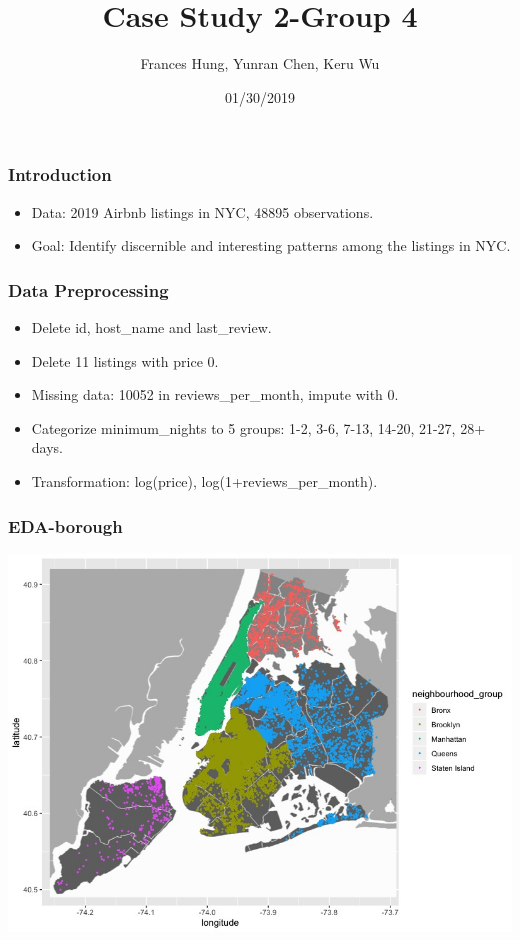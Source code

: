 \documentclass{beamer}
\title{Case Study 2-Group 4}
\author{Frances Hung, Yunran Chen, Keru Wu}
\institute{Department of Statistical Science, Duke University}
\date{01/30/2019}
\begin{document}
\frame{\titlepage}





\begin{frame}
\frametitle{Introduction}

\begin{itemize}
\item Data:  2019 Airbnb listings in NYC, 48895 observations.
  
\item Goal: Identify discernible and interesting patterns among the listings in NYC.

\end{itemize}

\end{frame}







\begin{frame}
\frametitle{Data Preprocessing}
\begin{itemize}
\item Delete id, host\_name and last\_review.
\item Delete 11 listings with price 0.
\item Missing data: 10052 in reviews\_per\_month, impute with 0.
\item Categorize minimum\_nights to 5 groups: 1-2, 3-6, 7-13, 14-20, 21-27, 28+ days. 
\item Transformation: log(price), log(1+reviews\_per\_month). 
\end{itemize}

\end{frame}



\begin{frame}
    \frametitle{EDA-borough}
\includegraphics[scale=0.4]{Borough.jpeg}
\end{frame}
\end{document}
